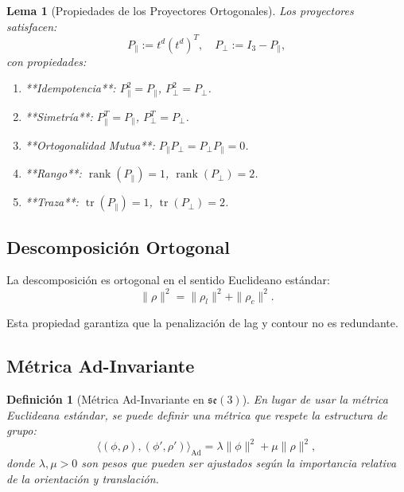 \documentclass[11pt,a4paper]{article}
\newtheorem{definition}[theorem]{Definición}
\newtheorem{lemma}[theorem]{Lema}
\begin{document}
\begin{lemma}[Propiedades de los Proyectores Ortogonales]
Los proyectores satisfacen:
\begin{equation}
    P_{\parallel} := t^d (t^d)^T, \quad P_{\perp} := I_3 - P_{\parallel},
\end{equation}
con propiedades:
\begin{enumerate}
    \item **Idempotencia**: $P_{\parallel}^2 = P_{\parallel}$, $P_{\perp}^2 = P_{\perp}$.
    \item **Simetría**: $P_{\parallel}^T = P_{\parallel}$, $P_{\perp}^T = P_{\perp}$.
    \item **Ortogonalidad Mutua**: $P_{\parallel} P_{\perp} = P_{\perp} P_{\parallel} = 0$.
    \item **Rango**: $\operatorname{rank}(P_{\parallel}) = 1$, $\operatorname{rank}(P_{\perp}) = 2$.
    \item **Traza**: $\operatorname{tr}(P_{\parallel}) = 1$, $\operatorname{tr}(P_{\perp}) = 2$.
\end{enumerate}
\end{lemma}

\subsection{Descomposición Ortogonal}

La descomposición es ortogonal en el sentido Euclideano estándar:
\begin{equation}
    \|\rho\|^2 = \|\rho_l\|^2 + \|\rho_c\|^2.
\end{equation}

Esta propiedad garantiza que la penalización de lag y contour no es redundante.

\subsection{Métrica Ad-Invariante}

\begin{definition}[Métrica Ad-Invariante en $\mathfrak{se}(3)$]
En lugar de usar la métrica Euclideana estándar, se puede definir una métrica que respete la estructura de grupo:
\begin{equation}
    \langle (\phi, \rho), (\phi', \rho') \rangle_{\text{Ad}} = \lambda \|\phi\|^2 + \mu \|\rho\|^2,
\end{equation}
donde $\lambda, \mu > 0$ son pesos que pueden ser ajustados según la importancia relativa de la orientación y translación.
\end{definition}
\end{document}
